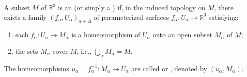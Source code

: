 A subset $M$ of $\mathbb{R}^3$ is an  (or simply a ) if, in the induced topology on $M$, there exists a family $(f_\alpha, U_\alpha)_{\alpha \in A}$ of parameterized surfaces $f_\alpha: U_\alpha \rightarrow \mathbb{R}^3$ satisfying:

\begin{enumerate}
\item[(i)] each $f_\alpha: U_\alpha \rightarrow M_\alpha$ is a homeomorphism of $U_\alpha$ onto an open subset $M_\alpha$ of $M$;
\item[(ii)] the sets $M_\alpha$ cover $M$, i.e., $\bigcup_\alpha M_\alpha = M$.
\end{enumerate}

The homeomorphisms $u_\alpha = f_\alpha^{-1}: M_\alpha \rightarrow U_\alpha$ are called  or , denoted by $(u_\alpha, M_\alpha)$.
